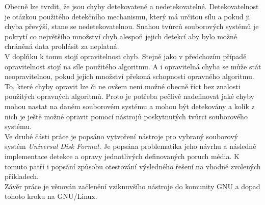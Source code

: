 Obecně lze tvrdit, že jsou chyby detekovatené a nedetekovatelné. Detekovatelnost je otázkou použitého detekčního mechanismu, který má určitou sílu a pokud ji chyba převýší, stane se nedetekovatelnou. Snahou tvůrců souborových systémů je pokrytí co největšího množství chyb alespoň jejich detekcí aby bylo možné chráněná data prohlásit za neplatná.\\
V doplňku k tomu stojí opravitelnost chyb. Stejně jako v předchozím případě opravitelnost stojí na síle použitého algoritmu. A i opravitelná chyba se může stát neopravitelnou, pokud jejich množství překoná schopnosti opravného algoritmu. To, které chyby opravit lze či ne ovšem není možné obecně říct bez znalosti použitých opravných algoritmů. Proto je potřeba pečlivě nadefinovat jaké chyby mohou nastat na daném souborovém systému a mohou být detekovány a kolik z nich je ještě možné opravit pomocí nástrojů poskytnutých tvůrci souborového systému.\\ 
Ve druhé části práce je popsáno vytvoření nástroje pro vybraný souborový systém \textit{Universal Disk Format}. Je popsána problematika jeho návrhu a následné implementace detekce a opravy jednotlivých definovaných poruch média. K tomuto patří i popsání způsobu otestování výsledného řešení na vhodně zvolených příkladech.\\
Závěr práce je věnován začlenění vziknuvšího nástroje do komunity GNU a dopad tohoto kroku na \mbox{GNU/Linux}.  

